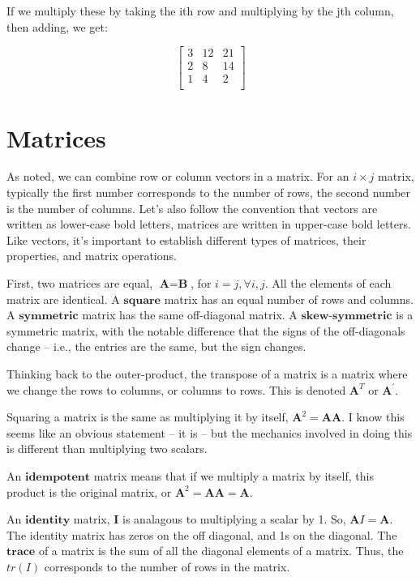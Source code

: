 \documentclass[
]{book}
\begin{document}
If we multiply these by taking the ith row and multiplying by the jth
column, then adding, we get:

\[
\begin{bmatrix}
3&12&21\\
2&8&14\\
1&4&2\\
\end{bmatrix}
\]

\section{Matrices}\label{matrices}

As noted, we can combine row or column vectors in a matrix. For an
\(i \times j\) matrix, typically the first number corresponds to the
number of rows, the second number is the number of columns. Let's also
follow the convention that vectors are written as lower-case bold
letters, matrices are written in upper-case bold letters. Like vectors,
it's important to establish different types of matrices, their
properties, and matrix operations.

First, two matrices are equal, \(\textbf{A}=\textbf{B}\), for
\(i=j,\forall i,j\). All the elements of each matrix are identical. A
\(\textbf{square}\) matrix has an equal number of rows and columns. A
\(\textbf{symmetric}\) matrix has the same off-diagonal matrix. A
\(\textbf{skew-symmetric}\) is a symmetric matrix, with the notable
difference that the signs of the off-diagonals change -- i.e., the
entries are the same, but the sign changes.

Thinking back to the outer-product, the transpose of a matrix is a
matrix where we change the rows to columns, or columns to rows. This is
denoted \(\textbf{A}^T\) or \(\textbf{A}^\prime\).

Squaring a matrix is the same as multiplying it by itself,
\(\textbf{A}^2=\textbf{A} \textbf{A}\). I know this seems like an obvious
statement -- it is -- but the mechanics involved in doing this is
different than multiplying two scalars.

An \(\textbf{idempotent}\) matrix means that if we multiply a matrix by
itself, this product is the original matrix, or
\(\textbf{A}^2=\textbf{A} \textbf{A}= \textbf{A}\).

An \(\textbf{identity}\) matrix, \(\textbf{I}\) is analagous to
multiplying a scalar by 1. So, \(\textbf{A}I= \textbf{A}\). The identity
matrix has zeros on the off diagonal, and 1s on the diagonal. The
\(\textbf{trace}\) of a matrix is the sum of all the diagonal elements
of a matrix. Thus, the \(tr(I)\) corresponds to the number of rows in the
matrix.
\end{document}
